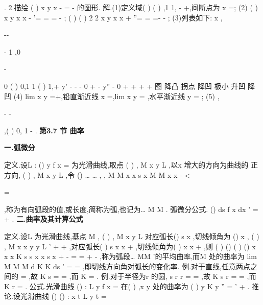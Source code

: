 . 
2.描绘
(
)
x
y
x
-
=
-
的图形. 
解.(1)定义域(
)
(
)
,1
1,
-\infty 
\cup 
+\infty ,间断点为
x =; 
(2)
(
)
x
y
x
x
-
'=
=
\Rightarrow 
=
-
;
(
)
(
)
2 2
x
y
x
x
+
''=
=
\Rightarrow 
=-
-
; 
(3)列表如下: 
x    
,


-\infty -




-
1 ,0


-




    0    (
)
0,1   1    (
)
1,+\infty  
y'       -       -       -       0     +    \times       - 
y''      -        0       +      +     +    \times       + 
图      降凸     拐点    降凹     极小   升凹   \times      降凹 
(4)
lim
x
y
\to 
=+\infty ,铅直渐近线
x =,lim
x
y
\to \infty 
=
,水平渐近线
y =
; 
(5)
,


-
-




,(
)
0, 1
-
. 
\vspace{6pt}
{\large \bfseries \textcolor{lyred}{第3.7 节 曲率}}

\vspace{4pt}
{\bfseries \textcolor{lyred}{一.弧微分}}

\textcolor{lyred}{定义}.设L :
()
y
f x
=
为\textcolor{lyred}{光滑曲线},取点
(
)
,
M
x
y
L
\in 
,以x 增大的方向为曲线的 
正方向,
(
)
,
M x y
L
\forall 
\in 
,令 
()
\dots 
\dots 
,
,
M M
x
x
s x
M M
x
x
-
<

=
\ge 

,称为\textcolor{lyred}{有向弧段的值},或\textcolor{lyred}{长度},简称为\textcolor{lyred}{弧},也记为\dots 
M M . 
\textcolor{lyred}{弧微分公式}.
()
ds
f
x
dx
'
=
+
.\textcolor{lyred}{ }
\vspace{4pt}
{\bfseries \textcolor{lyred}{二.曲率及其计算公式}}

\textcolor{lyred}{定义}.设L 为光滑曲线,基点
M ,
(
)
,
M x y
L
\in 
对应弧长()
s x ,切线倾角为
()
x
\alpha 
, 
(
)
,
M
x
x y
y
L
\Delta 
\Delta 
'
+
+
\in 
,对应弧长(
)
s x
x
\Delta 
+
,切线倾角为(
)
x
x
\alpha 
+\Delta 
,则 
(
)
()
(
)
()
x
x
x
K
s
s x
x
s x
\alpha 
\Delta 
\alpha 
\Delta \alpha 
\Delta 
\Delta 
+
-
=
=
+
-
,称为弧段\dots 
MM '的\textcolor{lyred}{平均曲率},而M 处的\textcolor{lyred}{曲率}为\textcolor{lyred}{ }
lim
M
M
M
d
K
K
ds
\alpha 
'\to 
=
=
,即切线方向角对弧长的变化率. 
\textcolor{lyred}{例}.对于直线,任意两点之间的
\Delta \alpha =
,故
K
s
\Delta \alpha 
\Delta 
=
=
,而
K =
. 
\textcolor{lyred}{例}.对于半径为r 的圆,
s
r
r
\Delta \alpha 
\Delta 
\pi 
\Delta \alpha 
\pi 
=
\cdots 
=
,故
K
s
r
\Delta \alpha 
\Delta 
=
=
,而
K
r
=
. 
\textcolor{lyred}{公式}.光滑曲线
()
:
L y
f x
=
在(
)
,x y 处的曲率为
(
)
y
K
y
''
=
'
+
.\textcolor{lyred}{ }
\textcolor{lyred}{推论}.设光滑曲线
()
()
:
x
t
L
y
t
\varphi 
\zeta 
=


